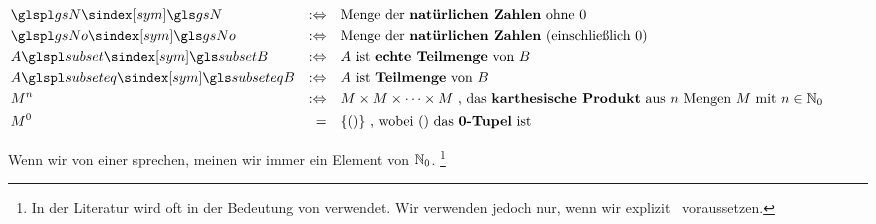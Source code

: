 \begin{align}
	& \glsSym{gsN}          & \metadefeq & \quad
	\text{Menge der \defn{natürlichen Zahlen}  ohne           $0$} \\
	& \glsSym{gsNo}         & \metadefeq & \quad
	\text{Menge der \defn{natürlichen Zahlen} (einschließlich $0$)} \\
	& A \glsSym{subset} B   & \metadefeq & \quad
	\text{$A$ ist \defn{echte Teilmenge} von $B$}                 \\
	& A \glsSym{subseteq} B & \metadefeq & \quad
	\text{$A$ ist       \defn{Teilmenge} von $B$}                 \\
	& M^n                   & \metadefeq & \quad
	M \times M \times \dots \times M
	\text{ , das \defn{karthesische Produkt} aus $n$ Mengen $M$ mit } n \in \gsNo \\
	& M^0                   & =          & \quad \{()\}
	\text{ , wobei $()$ das \defn{0-Tupel} ist}
	\formulaspace
\end{align}

Wenn wir von einer  sprechen, meinen wir immer ein Element von $\mathbb{N}_0$.%
\footnote{%
	In der Literatur wird \chrqt{$\subset$} oft in der Bedeutung von \chrqt{$\subseteq$} verwendet.
	Wir verwenden \chrqt{$\subset$} jedoch nur, wenn wir explizit \Ungleichheit\ voraussetzen.
}

